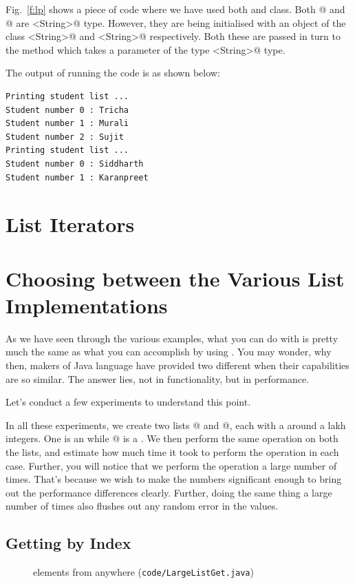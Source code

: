 \documentclass[12pt,a4paper]{article}
\begin{document}
Fig.~\ref{f:lp} shows a piece of code where we have used both \lstinline@ArrayList@ and \lstinline@LinkedList@ class. Both @ and @ are \lstinline@List<String>@ type. However, they are being initialised with an object of the class \lstinline@ArrayList<String>@ and \lstinline@LinkedList<String>@ respectively. Both these \lstinline@List@s are passed in turn to the \lstinline@printStudents@ method which takes a parameter of the type \lstinline@List<String>@ type.

The output of running the code is as shown below:
\begin{lstlisting}
Printing student list ...
Student number 0 : Tricha
Student number 1 : Murali
Student number 2 : Sujit
Printing student list ...
Student number 0 : Siddharth
Student number 1 : Karanpreet
\end{lstlisting}


\section{List Iterators}


\section{Choosing between the Various List Implementations} \label{s:alvsll}
As we have seen through the various examples, what you can do with \lstinline@ArrayList@ is pretty much the same as what you can accomplish by using \lstinline@LinkedList@. You may wonder, why then, makers of Java language have provided two different \lstinline@List@s when their capabilities are so similar. The answer lies, not in functionality, but in performance.

Let's conduct a few experiments to understand this point.

In all these experiments, we create two lists @ and @, each with a around a lakh integers. One is an \lstinline@ArrayList@ while @ is a \lstinline@Linkedlist@. We then perform the same operation on both the lists, and estimate how much time it took to perform the operation in each case. Further, you will notice that we perform the operation a large number of times. That's because we wish to make the numbers significant enough to bring out the performance differences clearly. Further, doing the same thing a large number of times also flushes out any random error in the values.

\subsection{Getting by Index}
\begin{figure}
	
	\caption{\lstinline@get@ting elements from anywhere (\texttt{code/LargeListGet.java})}
	\label{f:lg}
\end{figure}
\end{document}
